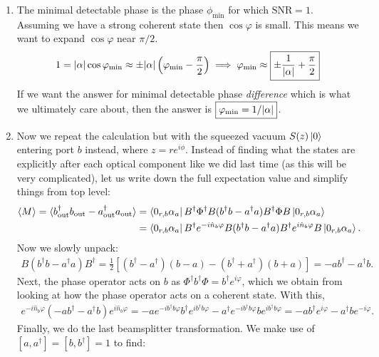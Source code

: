 \documentclass{article}
\theoremstyle{definition}
\newcommand{\al}{\alpha}
\newcommand{\f}[2]{\frac{#1}{#2}}
\newcommand{\lp}{\left(}
\newcommand{\rp}{\right)}
\newcommand{\lb}{\left[}
\newcommand{\rb}{\right]}
\begin{document}
\begin{enumerate}[label=(\alph*)]
\item The minimal detectable phase is the phase $\phi_\text{min}$ for which $\text{SNR} = 1$. Assuming we have a strong coherent state then $\cos \varphi$ is small. This means we want to expand $\cos \varphi$ near $\pi/2$.
\begin{align*}
1 = \abs{\al} \cos\varphi_\text{min} \approx  \pm \abs{\al} \lp \varphi_\text{min} - \f{\pi}{2}  \rp \implies \varphi_\text{min} \approx \boxed{ \pm \f{1}{\abs{\al}} + \f{\pi}{2}}
\end{align*}
If we want the answer for minimal detectable phase \textit{difference} which is what we ultimately care about, then the answer is $\boxed{\varphi_\text{min} = 1/\abs{\al}}$.

\item Now we repeat the calculation but with the squeezed vacuum $S(z) \ket{0}$ entering port $b$ instead, where $z = re^{i\phi}$. Instead of finding what the states are explicitly after each optical component like we did last time (as this will be very complicated), let us write down the full expectation value and simplify things from top level:
\begin{align*}
\langle M \rangle = \langle b_\text{out}^\dagger b_\text{out} - a_\text{out}^\dagger a_\text{out} \rangle 
&= \bra{0_{r,b} \al_a} B^\dagger \Phi^\dagger B   (b^\dagger b - a^\dagger a) B^\dagger \Phi B  \ket{0_{r,b} \al_a}\\
&= \bra{0_{r,b} \al_a} B^\dagger e^{-i \hat{n}_b \varphi} B   (b^\dagger b - a^\dagger a) B^\dagger e^{i \hat{n}_b \varphi} B  \ket{0_{r,b} \al_a}.
\end{align*}
Now we slowly unpack:
\begin{align*}
B(b^\dagger b - a^\dagger a) B^\dagger 
= \f{1}{2}\lb (b^\dagger - a^\dagger)(b-a) - (b^\dagger + a^\dagger)(b+a) \rb = -ab^\dagger - a^\dagger b.
\end{align*}
Next, the phase operator acts on $b$ as $\Phi^\dagger b^\dagger \Phi = b^\dagger e^{i\varphi}$, which we obtain from looking at how the phase operator acts on a coherent state. With this, 
\begin{align*}
e^{-i \hat{n}_b \varphi} (-ab^\dagger - a^\dagger b) e^{i \hat{n}_b \varphi} = -a e^{-i b^\dagger b \varphi}  b^\dagger e^{i b^\dagger b \varphi} - a^\dagger e^{-i b^\dagger b \varphi} b e^{i b^\dagger b \varphi} = 
-a b^\dagger e^{i\varphi} - a^\dagger b e^{-i\varphi}.
\end{align*}
Finally, we do the last beamsplitter transformation. We make use of $[a,a^\dagger] = [b,b^\dagger] = 1$ to find:

\end{enumerate}
\end{document}
